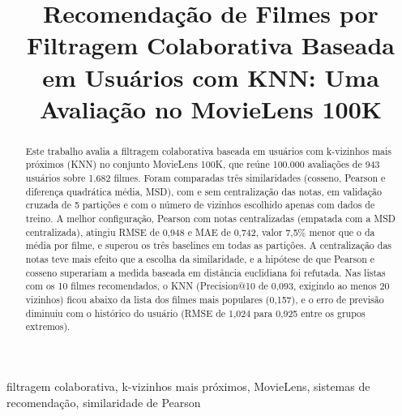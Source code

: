 \documentclass[conference]{IEEEtran}
\begin{document}
\title{Recomenda\c{c}\~ao de Filmes por Filtragem Colaborativa Baseada em Usu\'arios com KNN: Uma Avalia\c{c}\~ao no MovieLens 100K}

\author{
\IEEEauthorblockA{{[Curso]}\\
{[Institui\c{c}\~ao], [Cidade/UF]}\\
{[e-mail]}}
\and
{}
\IEEEauthorblockA{{[Curso]}\\
{[Institui\c{c}\~ao], [Cidade/UF]}\\
{[e-mail]}}
\and
{}
\IEEEauthorblockA{{[Curso]}\\
{[Institui\c{c}\~ao], [Cidade/UF]}\\
{[e-mail]}}}

\maketitle

\begin{abstract}
Este trabalho avalia a filtragem colaborativa baseada em usuários com k-vizinhos mais próximos (KNN) no conjunto MovieLens 100K, que reúne 100.000 avaliações de 943 usuários sobre 1.682 filmes. Foram comparadas três similaridades (cosseno, Pearson e diferença quadrática média, MSD), com e sem centralização das notas, em validação cruzada de 5 partições e com o número de vizinhos escolhido apenas com dados de treino. A melhor configuração, Pearson com notas centralizadas (empatada com a MSD centralizada), atingiu RMSE de 0,948 e MAE de 0,742, valor 7,5\% menor que o da média por filme, e superou os três baselines em todas as partições. A centralização das notas teve mais efeito que a escolha da similaridade, e a hipótese de que Pearson e cosseno superariam a medida baseada em distância euclidiana foi refutada. Nas listas com os 10 filmes recomendados, o KNN (Precision@10 de 0,093, exigindo ao menos 20 vizinhos) ficou abaixo da lista dos filmes mais populares (0,157), e o erro de previsão diminuiu com o histórico do usuário (RMSE de 1,024 para 0,925 entre os grupos extremos).
\end{abstract}

\begin{IEEEkeywords}
filtragem colaborativa, k-vizinhos mais pr\'oximos, MovieLens, sistemas de recomenda\c{c}\~ao, similaridade de Pearson
\end{IEEEkeywords}
\end{document}
